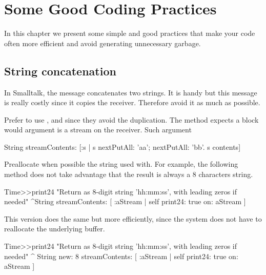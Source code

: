 \documentclass[a4paper,10pt,twoside]{book}
\begin{document}
	\sloppy
\fi



\chapter{Some Good Coding Practices}


In this chapter we present some simple and good practices that make your code often more efficient and 
avoid generating unnecessary garbage. 

\section*{String concatenation}

In Smalltalk, the message \ct{,}  concatenates two strings. It is handy but this message is really costly since it copies the receiver. Therefore avoid it as much as possible. 

Prefer to use  ,  and  since they avoid the duplication. The method  expects a block would argument is a stream on the receiver. 
Such argument 

\begin{code}{}
String streamContents: [:s |
	s nextPutAll: 'aa'; nextPutAll: 'bb'.
	s contents]
\end{code}


Preallocate when possible the string used with. For example, the following method does not take advantage that the result is always a 8 characters string. 

\begin{code}{}
Time>>print24
 	"Return as 8-digit string 'hh:mm:ss', with leading zeros if needed"
 	^String streamContents:
 		[ :aStream | self print24: true on: aStream ]
\end{code}

This version does the same but more efficiently, since the system does not have to reallocate the underlying buffer. 
\begin{code}{}
Time>>print24
 	"Return as 8-digit string 'hh:mm:ss', with leading zeros if needed"
 	^ String new: 8 streamContents: [ :aStream | 
		self print24: true on: aStream ]
\end{code}		
\end{document}
